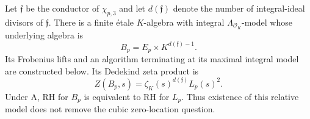 \begin{proposition}
\label{AC-K03}
Let $\mathfrak f$ be the conductor of $\chi_{p,3}$ and let
$d(\mathfrak f)$ denote the number of integral-ideal divisors
of $\mathfrak f$. There is a finite \'etale $K$-algebra with
integral $\Lambda_{\mathcal O_K}$-model whose underlying algebra is
\begin{equation}
 B_{p}=E_p\times K^{d(\mathfrak f)-1}.              \label{eq:minhost}
\end{equation}
Its Frobenius lifts and an algorithm terminating at its maximal
integral model are constructed below. Its Dedekind zeta product is
\begin{equation}
 Z(B_p,s)=\zeta_K(s)^{d(\mathfrak f)}L_p(s)^2.       \label{eq:minhost-zeta}
\end{equation}
Under A, RH for $B_p$ is equivalent to RH for $L_p$.
Thus existence of this relative model does not remove the cubic
zero-location question.
\end{proposition}
